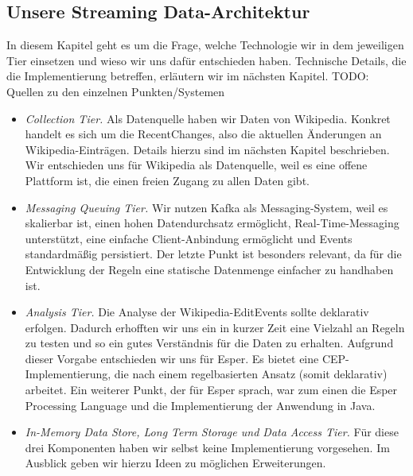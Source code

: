 \subsection{Unsere Streaming Data-Architektur}
In diesem Kapitel geht es um die Frage, welche Technologie wir in dem jeweiligen Tier einsetzen und wieso wir uns dafür entschieden haben.
Technische Details, die die Implementierung betreffen, erläutern wir im nächsten Kapitel.
TODO: Quellen zu den einzelnen Punkten/Systemen
\begin{itemize}
    \item \textit{Collection Tier.} Als Datenquelle haben wir Daten von Wikipedia. Konkret handelt es sich um die RecentChanges,
    also die aktuellen Änderungen an Wikipedia-Einträgen. Details hierzu sind im nächsten Kapitel beschrieben. Wir entschieden uns für Wikipedia als
    Datenquelle, weil es eine offene Plattform ist, die einen freien Zugang zu allen Daten gibt.

    \item \textit{Messaging Queuing Tier.} Wir nutzen Kafka als Messaging-System, weil es skalierbar ist, einen hohen Datendurchsatz ermöglicht,
    Real-Time-Messaging unterstützt, eine einfache Client-Anbindung ermöglicht und Events standardmäßig persistiert. Der letzte Punkt ist
    besonders relevant, da für die Entwicklung der Regeln eine statische Datenmenge einfacher zu handhaben ist.

    \item \textit{Analysis Tier.} Die Analyse der Wikipedia-EditEvents sollte deklarativ erfolgen. Dadurch erhofften wir uns ein
    in kurzer Zeit eine Vielzahl an Regeln zu testen und so ein gutes Verständnis für die Daten zu erhalten. Aufgrund dieser Vorgabe
    entschieden wir uns für Esper. Es bietet eine CEP-Implementierung, die nach einem regelbasierten Ansatz (somit deklarativ) arbeitet.
    Ein weiterer Punkt, der für Esper sprach, war zum einen die Esper Processing Language und die Implementierung der Anwendung in Java.

    \item \textit{In-Memory Data Store, Long Term Storage und Data Access Tier.} Für diese drei Komponenten haben wir selbst keine Implementierung vorgesehen.
    Im Ausblick geben wir hierzu Ideen zu möglichen Erweiterungen.
\end{itemize}
